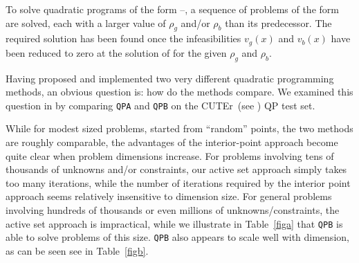 \documentclass[twoside]{article}
\newcommand{\cuter}{{\sf CUTEr}}
\begin{document}
To solve quadratic programs of the form --,
a sequence of problems of the form  are
solved, each with a larger value of $\rho_g$ and/or $\rho_b$
than its predecessor. The
required solution has been found once the infeasibilities
$v_g(x)$ and $v_b(x)$ have been reduced to zero at the solution of
 for the given $\rho_g$ and $\rho_b$.

Having proposed and implemented two very different quadratic programming
methods, an obvious question is: how do the methods compare. We examined
this question in  by comparing {\tt QPA} and {\tt QPB}
on the \cuter\ (see ) QP test set.

While for modest sized problems, started from ``random'' points, the two
methods are roughly comparable, the advantages of the interior-point approach
become quite clear when problem dimensions increase. For problems involving
tens of thousands of unknowns and/or constraints, our active set approach
simply takes too many iterations, while the number of iterations
required by the interior point approach seems relatively insensitive to
dimension size. For general problems involving hundreds of thousands or
even millions of unknowns/constraints, the active set approach is impractical,
while we illustrate in Table~\ref{figa} that
{\tt QPB} is able to solve problems of this size.
{\tt QPB} also appears to scale well with dimension, as can be seen
see in Table~\ref{figb}.
\end{document}
